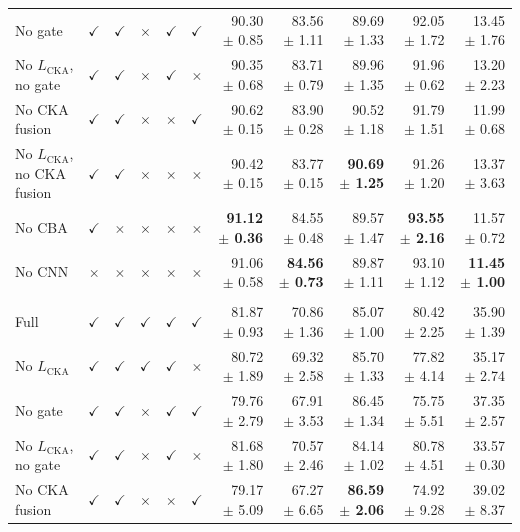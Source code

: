 \documentclass[10pt]{article}
\begin{document}
{\begin{longtable}{lccccc rrrrr}
No gate & $\checkmark$ & $\checkmark$ & $\times$ & $\checkmark$ & $\checkmark$ & 90.30 $\pm$ 0.85 & 83.56 $\pm$ 1.11 & 89.69 $\pm$ 1.33 & 92.05 $\pm$ 1.72 & 13.45 $\pm$ 1.76 \\
No $L_{\mathrm{CKA}}$, no gate & $\checkmark$ & $\checkmark$ & $\times$ & $\checkmark$ & $\times$ & 90.35 $\pm$ 0.68 & 83.71 $\pm$ 0.79 & 89.96 $\pm$ 1.35 & 91.96 $\pm$ 0.62 & 13.20 $\pm$ 2.23 \\
No CKA fusion & $\checkmark$ & $\checkmark$ & $\times$ & $\times$ & $\checkmark$ & 90.62 $\pm$ 0.15 & 83.90 $\pm$ 0.28 & 90.52 $\pm$ 1.18 & 91.79 $\pm$ 1.51 & 11.99 $\pm$ 0.68 \\
No $L_{\mathrm{CKA}}$, no CKA fusion & $\checkmark$ & $\checkmark$ & $\times$ & $\times$ & $\times$ & 90.42 $\pm$ 0.15 & 83.77 $\pm$ 0.15 & \textbf{90.69 $\pm$ 1.25} & 91.26 $\pm$ 1.20 & 13.37 $\pm$ 3.63 \\
No CBA & $\checkmark$ & $\times$ & $\times$ & $\times$ & $\times$ & \textbf{91.12 $\pm$ 0.36} & 84.55 $\pm$ 0.48 & 89.57 $\pm$ 1.47 & \textbf{93.55 $\pm$ 2.16} & 11.57 $\pm$ 0.72 \\
No CNN & $\times$ & $\times$ & $\times$ & $\times$ & $\times$ & 91.06 $\pm$ 0.58 & \textbf{84.56 $\pm$ 0.73} & 89.87 $\pm$ 1.11 & 93.10 $\pm$ 1.12 & \textbf{11.45 $\pm$ 1.00} \\
\addlinespace[4pt]
\multicolumn{11}{l}{\textit{Source: OVATUS $\rightarrow$ Target: USOVA}} \\
\midrule
Full & $\checkmark$ & $\checkmark$ & $\checkmark$ & $\checkmark$ & $\checkmark$ & 81.87 $\pm$ 0.93 & 70.86 $\pm$ 1.36 & 85.07 $\pm$ 1.00 & 80.42 $\pm$ 2.25 & 35.90 $\pm$ 1.39 \\
No $L_{\mathrm{CKA}}$ & $\checkmark$ & $\checkmark$ & $\checkmark$ & $\checkmark$ & $\times$ & 80.72 $\pm$ 1.89 & 69.32 $\pm$ 2.58 & 85.70 $\pm$ 1.33 & 77.82 $\pm$ 4.14 & 35.17 $\pm$ 2.74 \\
No gate & $\checkmark$ & $\checkmark$ & $\times$ & $\checkmark$ & $\checkmark$ & 79.76 $\pm$ 2.79 & 67.91 $\pm$ 3.53 & 86.45 $\pm$ 1.34 & 75.75 $\pm$ 5.51 & 37.35 $\pm$ 2.57 \\
No $L_{\mathrm{CKA}}$, no gate & $\checkmark$ & $\checkmark$ & $\times$ & $\checkmark$ & $\times$ & 81.68 $\pm$ 1.80 & 70.57 $\pm$ 2.46 & 84.14 $\pm$ 1.02 & 80.78 $\pm$ 4.51 & 33.57 $\pm$ 0.30 \\
No CKA fusion & $\checkmark$ & $\checkmark$ & $\times$ & $\times$ & $\checkmark$ & 79.17 $\pm$ 5.09 & 67.27 $\pm$ 6.65 & \textbf{86.59 $\pm$ 2.06} & 74.92 $\pm$ 9.28 & 39.02 $\pm$ 8.37 \\

\end{longtable}}
\end{document}
